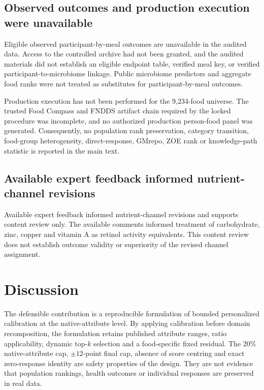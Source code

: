 \subsection*{Observed outcomes and production execution were unavailable}

Eligible observed participant-by-meal outcomes are unavailable in the audited
data. Access to the controlled archive had not been granted, and the audited materials
did not establish an eligible endpoint table, verified meal key, or verified
participant-to-microbiome linkage. Public microbiome predictors and aggregate
food ranks were not treated as substitutes for participant-by-meal outcomes.

Production execution has not been performed for the 9,234-food universe. The
trusted Food Compass and FNDDS artifact chain required by the locked procedure
was incomplete, and no authorized production person-food panel was generated.
Consequently, no population rank preservation, category transition, food-group
heterogeneity, direct-response, GMrepo, ZOE rank or knowledge-path statistic is
reported in the main text.

\subsection*{Available expert feedback informed nutrient-channel revisions}

Available expert feedback informed nutrient-channel revisions and supports
content review only. The available comments informed treatment of carbohydrate,
zinc, copper and vitamin A as retinol activity equivalents. This content review
does not establish outcome validity or superiority of the revised channel
assignment.

\section*{Discussion}

The defensible contribution is a reproducible formulation of bounded
personalized calibration at the native-attribute level. By applying calibration
before domain recomposition, the formulation retains published attribute
ranges, ratio applicability, dynamic top-\(k\) selection and a food-specific
fixed residual. The 20\% native-attribute cap, \(\pm 12\)-point final cap,
absence of score centring and exact zero-response identity are safety properties
of the design. They are not evidence that population rankings, health outcomes
or individual responses are preserved in real data.

